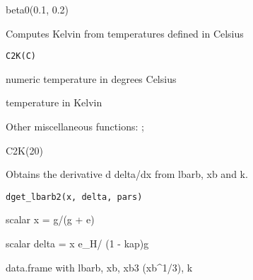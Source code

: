 \documentclass[a4paper]{book}
\begin{document}
%
\begin{Examples}
\begin{ExampleCode}
beta0(0.1, 0.2)
\end{ExampleCode}
\end{Examples}
%
\begin{Description}\relax
Computes Kelvin from temperatures defined in Celsius
\end{Description}
%
\begin{Usage}
\begin{verbatim}
C2K(C)
\end{verbatim}
\end{Usage}
%
\begin{Arguments}
\begin{ldescription}
\item[\code{C}] numeric temperature in degrees Celsius
\end{ldescription}
\end{Arguments}
%
\begin{Value}
temperature in Kelvin
\end{Value}
%
\begin{SeeAlso}\relax
Other miscellaneous functions: ;
\end{SeeAlso}
%
\begin{Examples}
\begin{ExampleCode}
C2K(20)
\end{ExampleCode}
\end{Examples}
%
\begin{Description}\relax
Obtains the derivative d delta/dx from lbarb, xb and k.
\end{Description}
%
\begin{Usage}
\begin{verbatim}
dget_lbarb2(x, delta, pars)
\end{verbatim}
\end{Usage}
%
\begin{Arguments}
\begin{ldescription}
\item[\code{x}] scalar x = g/(g + e)

\item[\code{delta}] scalar delta = x e\_H/ (1 - kap)g

\item[\code{pars}] data.frame with lbarb, xb, xb3 (xb\textasciicircum{}1/3), k
\end{ldescription}
\end{Arguments}
\end{document}
